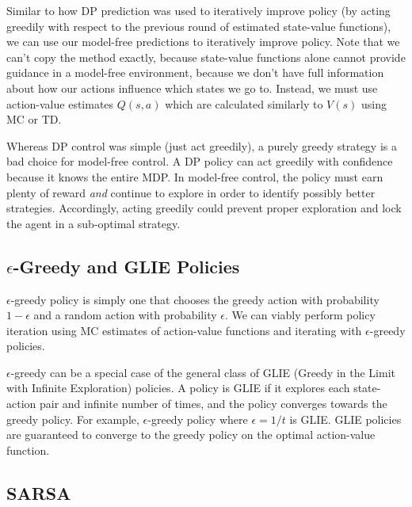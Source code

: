 \documentclass{article}
\newcommand{\ita}{\textit}
\newcommand{\eps}{\epsilon}
\begin{document}
Similar to how DP prediction was used to iteratively improve policy (by acting greedily with respect to the previous round of estimated state-value functions), we can use our model-free predictions to iteratively improve policy. Note that we can't copy the method exactly, because state-value functions alone cannot provide guidance in a model-free environment, because we don't have full information about how our actions influence which states we go to. Instead, we must use action-value estimates $Q(s, a)$ which are calculated similarly to $V(s)$ using MC or TD.

Whereas DP control was simple (just act greedily), a purely greedy strategy is a bad choice for model-free control. A DP policy can act greedily with confidence because it knows the entire MDP. In model-free control, the policy must earn plenty of reward \ita{and} continue to explore in order to identify possibly better strategies. Accordingly, acting greedily could prevent proper exploration and lock the agent in a sub-optimal strategy.

\subsection{$\eps$-Greedy and GLIE Policies}

$\eps$-greedy policy is simply one that chooses the greedy action with probability $1-\eps$ and a random action with probability $\eps$. We can viably perform policy iteration using MC estimates of action-value functions and iterating with $\eps$-greedy policies.

$\eps$-greedy can be a special case of the general class of GLIE (Greedy in the Limit with Infinite Exploration) policies. A policy is GLIE if it explores each state-action pair and infinite number of times, and the policy converges towards the greedy policy. For example, $\eps$-greedy policy where $\eps = 1/t$ is GLIE. GLIE policies are guaranteed to converge to the greedy policy on the optimal action-value function.

\subsection{SARSA}
\end{document}
